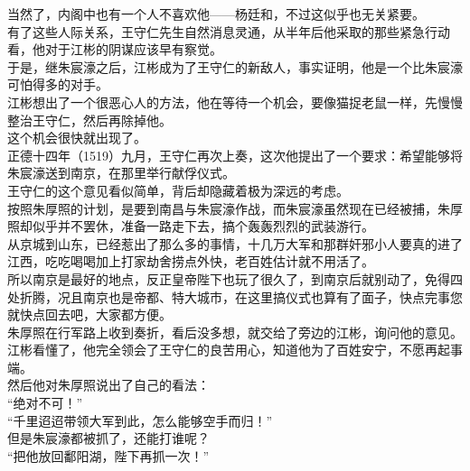 \begin{multicols}{\theparacolNo}
当然了，内阁中也有一个人不喜欢他——杨廷和，不过这似乎也无关紧要。\\

有了这些人际关系，王守仁先生自然消息灵通，从半年后他采取的那些紧急行动看，他对于江彬的阴谋应该早有察觉。\\

于是，继朱宸濠之后，江彬成为了王守仁的新敌人，事实证明，他是一个比朱宸濠可怕得多的对手。\\

江彬想出了一个很恶心人的方法，他在等待一个机会，要像猫捉老鼠一样，先慢慢整治王守仁，然后再除掉他。\\

这个机会很快就出现了。\\

正德十四年（1519）九月，王守仁再次上奏，这次他提出了一个要求：希望能够将朱宸濠送到南京，在那里举行献俘仪式。\\

王守仁的这个意见看似简单，背后却隐藏着极为深远的考虑。\\

按照朱厚照的计划，是要到南昌与朱宸濠作战，而朱宸濠虽然现在已经被捕，朱厚照却似乎并不罢休，准备一路走下去，搞个轰轰烈烈的武装游行。\\

从京城到山东，已经惹出了那么多的事情，十几万大军和那群奸邪小人要真的进了江西，吃吃喝喝加上打家劫舍捞点外快，老百姓估计就不用活了。\\

所以南京是最好的地点，反正皇帝陛下也玩了很久了，到南京后就别动了，免得四处折腾，况且南京也是帝都、特大城市，在这里搞仪式也算有了面子，快点完事您就快点回去吧，大家都方便。\\

朱厚照在行军路上收到奏折，看后没多想，就交给了旁边的江彬，询问他的意见。\\

江彬看懂了，他完全领会了王守仁的良苦用心，知道他为了百姓安宁，不愿再起事端。\\

然后他对朱厚照说出了自己的看法：\\

“绝对不可！”\\

“千里迢迢带领大军到此，怎么能够空手而归！”\\

但是朱宸濠都被抓了，还能打谁呢？\\

“把他放回鄱阳湖，陛下再抓一次！”\\


\end{multicols}
